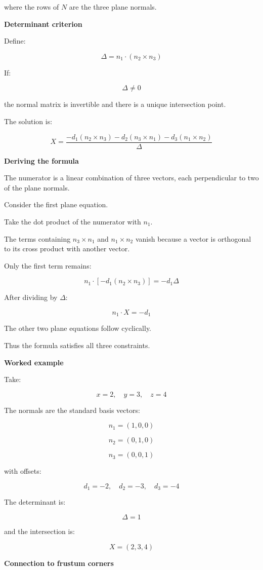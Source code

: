 where the rows of \(N\) are the three plane normals.

\textbf{Determinant criterion}

Define:

\[
\boxed{ \Delta=n_1\cdot(n_2\times n_3) }
\]

If:

\[
\Delta\ne0
\]

the normal matrix is invertible and there is a unique intersection point.

The solution is:

\[
\boxed{ X= \frac{ -d_1(n_2\times n_3) -d_2(n_3\times n_1) -d_3(n_1\times n_2) }{ \Delta } }
\]

\textbf{Deriving the formula}

The numerator is a linear combination of three vectors, each perpendicular to two of the plane normals.

Consider the first plane equation.

Take the dot product of the numerator with \(n_1\).

The terms containing \(n_3\times n_1\) and \(n_1\times n_2\) vanish because a vector is orthogonal to its cross product with another vector.

Only the first term remains:

\[
n_1\cdot[-d_1(n_2\times n_3)] =-d_1\Delta
\]

After dividing by \(\Delta\):

\[
n_1\cdot X=-d_1
\]

The other two plane equations follow cyclically.

Thus the formula satisfies all three constraints.

\textbf{Worked example}

Take:

\[
x=2,\quad y=3,\quad z=4
\]

The normals are the standard basis vectors:

\[
n_1=(1,0,0)
\]

\[
n_2=(0,1,0)
\]

\[
n_3=(0,0,1)
\]

with offsets:

\[
d_1=-2,\quad d_2=-3,\quad d_3=-4
\]

The determinant is:

\[
\Delta=1
\]

and the intersection is:

\[
\boxed{X=(2,3,4)}
\]

\textbf{Connection to frustum corners}

